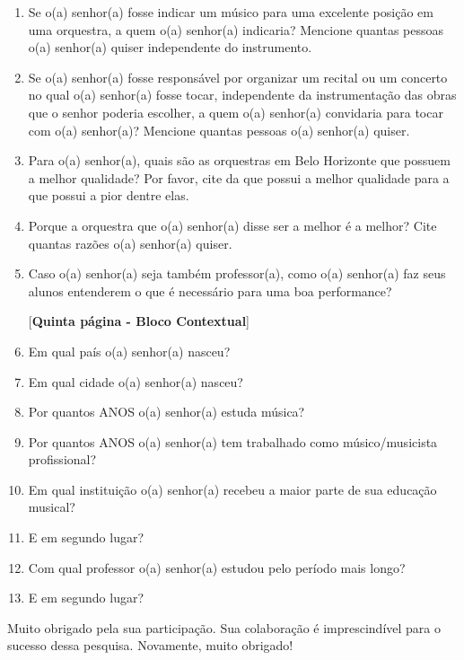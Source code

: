\documentclass[a4paper, 12pt, openright, oneside, german, french, english, brazil]{abntex2}
\begin{document}
\begin{enumerate}
		\item Se o(a) senhor(a) fosse indicar um músico para uma excelente posição em uma orquestra, a quem o(a) senhor(a) indicaria? Mencione quantas pessoas o(a) senhor(a) quiser independente do instrumento.
		
		\item Se o(a) senhor(a) fosse responsável por organizar um recital ou um concerto no qual o(a) senhor(a) fosse tocar, independente da instrumentação das obras que o senhor poderia escolher, a quem o(a) senhor(a) convidaria para tocar com o(a) senhor(a)? Mencione quantas pessoas o(a) senhor(a) quiser.
		
		\item Para o(a) senhor(a), quais são as orquestras em Belo Horizonte que possuem a melhor qualidade? Por favor, cite da que possui a melhor qualidade para a que possui a pior dentre elas.
		
		\item Porque a orquestra que o(a) senhor(a) disse ser a melhor é a melhor? Cite quantas razões o(a) senhor(a) quiser.
		
		\item Caso o(a) senhor(a) seja também professor(a), como o(a) senhor(a) faz seus alunos entenderem o que é necessário para uma boa performance?
		
		
		
		
		[\textbf{Quinta página - Bloco Contextual}]
		
		
		\item Em qual país o(a) senhor(a) nasceu?
		\item Em qual cidade o(a) senhor(a) nasceu?
		\item Por quantos ANOS o(a) senhor(a) estuda música?
		\item Por quantos ANOS o(a) senhor(a) tem trabalhado como músico/musicista profissional?
		\item Em qual instituição o(a) senhor(a) recebeu a maior parte de sua educação musical?
		\item E em segundo lugar?
		\item Com qual professor o(a) senhor(a) estudou pelo período mais longo?
		\item E em segundo lugar?
		
	\end{enumerate}
	
	Muito obrigado pela sua participação. Sua colaboração é imprescindível para o sucesso dessa pesquisa. Novamente, muito obrigado!
	
\end{document}
